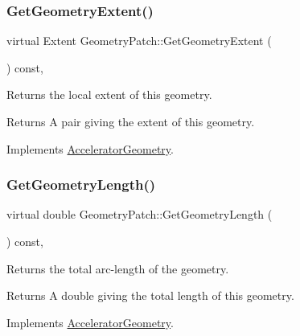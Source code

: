 \subsubsection{\texorpdfstring{Get\+Geometry\+Extent()}{GetGeometryExtent()}}
{\footnotesize\ttfamily virtual Extent Geometry\+Patch\+::\+Get\+Geometry\+Extent (\begin{DoxyParamCaption}{ }\end{DoxyParamCaption}) const\hspace{0.3cm}{\ttfamily [inline]}, {\ttfamily [virtual]}}

Returns the local extent of this geometry. \begin{DoxyReturn}{Returns}
A pair giving the extent of this geometry. 
\end{DoxyReturn}


Implements \hyperlink{classAcceleratorGeometry_a2db830fe927af3c9cba59b8452370bfb}{Accelerator\+Geometry}.

\mbox{\label{classGeometryPatch_ae2d9aef3fc3df96fdf0340124f099997}} 
\subsubsection{\texorpdfstring{Get\+Geometry\+Length()}{GetGeometryLength()}}
{\footnotesize\ttfamily virtual double Geometry\+Patch\+::\+Get\+Geometry\+Length (\begin{DoxyParamCaption}{ }\end{DoxyParamCaption}) const\hspace{0.3cm}{\ttfamily [inline]}, {\ttfamily [virtual]}}

Returns the total arc-\/length of the geometry. \begin{DoxyReturn}{Returns}
A double giving the total length of this geometry. 
\end{DoxyReturn}


Implements \hyperlink{classAcceleratorGeometry_abc36f96d542e0d9db592f8e7ee455769}{Accelerator\+Geometry}.

\mbox{\label{classGeometryPatch_ae45360bf4f4a8bad9189eb34bca2a919}} 

